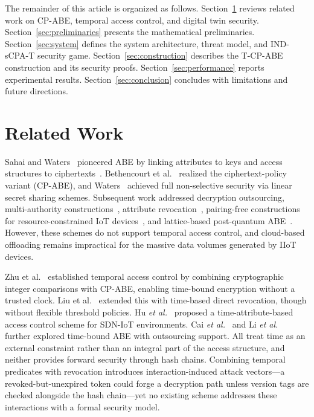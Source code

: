 ﻿\documentclass[lettersize,journal]{IEEEtran}
\newcommand{\etal}{\textit{et al.}}
\begin{document}
The remainder of this article is organized as follows. Section~\ref{sec:related}
reviews related work on CP-ABE, temporal access control, and digital twin
security. Section~\ref{sec:preliminaries} presents the mathematical
preliminaries. Section~\ref{sec:system} defines the system architecture,
threat model, and IND-sCPA-T security game.
Section~\ref{sec:construction} describes the T-CP-ABE construction and its
security proofs. Section~\ref{sec:performance} reports experimental results.
Section~\ref{sec:conclusion} concludes with limitations and future directions.

\section{Related Work}
\label{sec:related}

Sahai and Waters~\cite{Sahai2005} pioneered ABE by linking attributes to keys
and access structures to ciphertexts~\cite{Shruti2023}. Bethencourt et
al.~\cite{Bethencourt2007} realized the ciphertext-policy variant (CP-ABE),
and Waters~\cite{Waters2011} achieved full non-selective security via linear
secret sharing schemes. Subsequent work addressed decryption
outsourcing, multi-authority
constructions~\cite{DecentralisedMAABE2025, Zhang2026_MultiAuthority,
Penuelas2024_MultiAuthority, Datta2025_Decentralized}, attribute
revocation~\cite{Liu2023_Revocation, Ghopur2023}, pairing-free
constructions for resource-constrained IoT
devices~\cite{Guo2024, Zhang2024_TDSC}, and
lattice-based post-quantum
ABE~\cite{Gasparini2026_LatticeBenchmark, Li2022_CPABE_Survey}. However, these
schemes do not support temporal access control, and cloud-based offloading
remains impractical for the massive data volumes generated by IIoT devices.

Zhu et al.~\cite{Zhu2012} established temporal access control by combining
cryptographic integer comparisons with CP-ABE, enabling time-bound encryption
without a trusted clock. Liu et al.~\cite{Liu2018_ACNS} extended this with
time-based direct revocation, though without flexible threshold policies.
Hu \etal~\cite{Hu2024_TAAC} proposed a time-attribute-based access control
scheme for SDN-IoT environments. Cai \etal~\cite{Cai2023_TimeABE} and
Li \etal~\cite{Li2023_HierarchicalABE} further explored time-bound ABE with
outsourcing support. All treat time as an external constraint rather than an integral part of the
access structure, and neither provides forward security through hash chains.
Combining temporal predicates with revocation introduces interaction-induced
attack vectors---a revoked-but-unexpired token could forge a decryption path
unless version tags are checked alongside the hash chain---yet no existing
scheme addresses these interactions with a formal security model.
\end{document}
